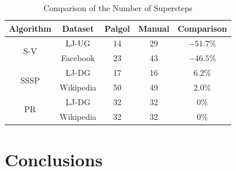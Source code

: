 \documentclass{sokendai_thesis} %
\begin{document}
\begin{table}[t]
 \centering
 \caption{Comparison of the Number of Supersteps}
 \label{tab:steps}
 \begin{tabular}{c|c|c|c|c}
  \hline
  \textbf{Algorithm} & \textbf{Dataset} & Palgol & Manual & Comparison \\
  \hline\hline
  \multirow{2}{*}{S-V} & LJ-UG & 14 & 29 & $-51.7$\% \\
  \cline{2-5}
  & Facebook & 23 & 43 & $-46.5$\% \\
  \hline
  \multirow{2}{*}{SSSP} & LJ-DG & 17 & 16 & $6.2$\% \\
  \cline{2-5}
  & Wikipedia & 50 & 49 & 2.0\% \\
  \hline
  \multirow{2}{*}{PR} & LJ-DG & 32 & 32 & $0$\% \\
  \cline{2-5}
  & Wikipedia & 32 & 32 & $0$\% \\
  \hline
 \end{tabular}
\vspace{-2ex}\end{table}

\chapter{Conclusions}
\label{sec:conclusions}
\end{document}
